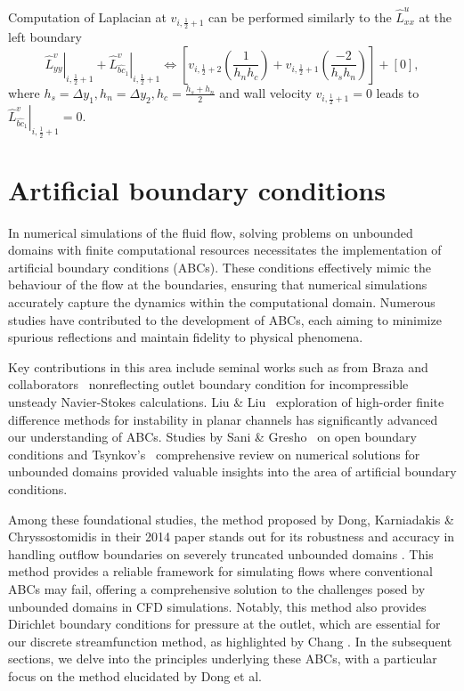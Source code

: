\documentclass{article}
\numberwithin{equation}{section}
\begin{document}
Computation of Laplacian at $v_{i,\frac{1}{2}+1}$ can be performed similarly to the $\hat{L}_{xx}^u$ at the left boundary 
\begin{equation}
	\left.\hat{L}_{yy}^v\right|_{i,\frac{1}{2}+1}+\left.\hat{L}^v_{\hat{bc}_1}\right|_{i,\frac{1}{2}+1} \iff  \left [v_{i,\frac{1}{2}+2}\left(\frac{1}{h_n h_c}\right)+v_{i,\frac{1}{2}+1}\left(\frac{-2}{h_s h_n}\right)\right]+\left[0\right],
\end{equation}
where $h_s={\Delta y_1},h_n=\Delta y_2,h_c=\frac{h_s+h_n}{2}$ and wall velocity $v_{i,\frac{1}{2}+1}=0$ leads to $\left.\hat{L}^v_{\hat{bc}_1}\right|_{i,\frac{1}{2}+1}=0$.












\pagebreak
\section{Artificial boundary conditions}\label{sec:artificial-bc}

In numerical simulations of the fluid flow, solving problems on unbounded domains with finite computational resources necessitates the implementation of artificial boundary conditions (ABCs). These conditions effectively mimic the behaviour of the flow at the boundaries, ensuring that numerical simulations accurately capture the dynamics within the computational domain. Numerous studies have contributed to the development of ABCs, each aiming to minimize spurious reflections and maintain fidelity to physical phenomena.

Key contributions in this area include seminal works such as from Braza and collaborators~\cite{Jin:1993, Kourta:1987,Persillon:1998}  nonreflecting outlet boundary condition for incompressible unsteady Navier-Stokes calculations. Liu \& Liu~\cite{Liu:1993} exploration of high-order finite difference methods for instability in planar channels has significantly advanced our understanding of ABCs. Studies by Sani \& Gresho~\cite{Sani:1994} on open boundary conditions and Tsynkov's~\cite{Tsynkov:1998} comprehensive review on numerical solutions for unbounded domains  provided valuable insights into the area of artificial boundary conditions.

Among these foundational studies, the method proposed by Dong, Karniadakis \& Chryssostomidis in their 2014 paper stands out for its robustness and accuracy in handling outflow boundaries on severely truncated unbounded domains \cite{Dong:2014}. This method provides a reliable framework for simulating flows where conventional ABCs may fail, offering a comprehensive solution to the challenges posed by unbounded domains in CFD simulations. Notably, this method also provides Dirichlet boundary conditions for pressure at the outlet, which are essential for our discrete streamfunction method, as highlighted by Chang \cite{Chang:2002}. In the subsequent sections, we delve into the principles underlying these ABCs, with a particular focus on the method elucidated by Dong et al. 
\end{document}
